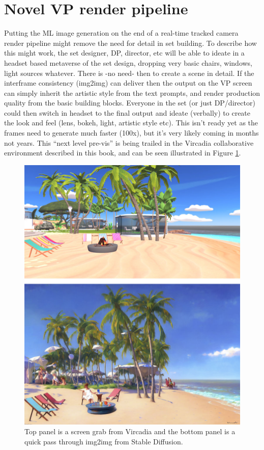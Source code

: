 \section{Novel VP render pipeline}
Putting the ML image generation on the end of a real-time tracked camera render pipeline might remove the need for detail in set building. To describe how this might work, the set designer, DP, director, etc will be able to ideate in a headset based metaverse of the set design, dropping very basic chairs, windows, light sources whatever. There is -no need- then to create a scene in detail. If the interframe consistency (img2img) can deliver then the output on the VP screen can simply inherit the artistic style from the text prompts, and render production quality from the basic building blocks. Everyone in the set (or just DP/director) could then switch in headset to the final output and ideate (verbally) to create the look and feel (lens, bokeh, light, artistic style etc). This isn’t ready yet as the frames need to generate much faster (100x), but it’s very likely coming in months not years. This ``next level pre-vis'' is being trailed in the Vircadia collaborative environment described in this book, and can be seen illustrated in Figure \ref{fig:vircadiasd}.\par
\begin{figure}[ht]\centering 	\includegraphics{vircadiasd}
	\caption{Top panel is a screen grab from Vircadia and the bottom panel is a quick pass through img2img from Stable Diffusion.}
	\label{fig:vircadiasd}
\end{figure}

